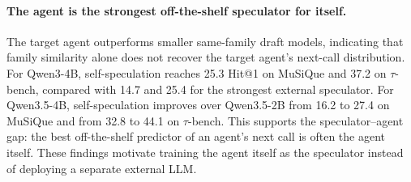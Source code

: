 \paragraph{The agent is the strongest off-the-shelf speculator for itself.} The
target agent outperforms smaller same-family draft models, indicating that
family similarity alone does not recover the target agent's next-call
distribution. For Qwen3-4B, self-speculation reaches 25.3 Hit@1 on MuSiQue and
37.2 on $\tau$-bench, compared with 14.7 and 25.4 for the strongest external
speculator. For Qwen3.5-4B, self-speculation improves over Qwen3.5-2B from 16.2
to 27.4 on MuSiQue and from 32.8 to 44.1 on $\tau$-bench. This supports the
speculator--agent gap: the best off-the-shelf predictor of an agent's next call
is often the agent itself. These findings motivate training the agent itself as
the speculator instead of deploying a separate external LLM.
